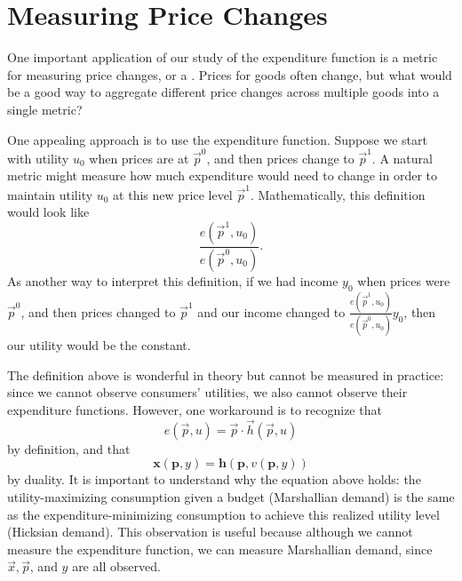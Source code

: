 
\section{Measuring Price Changes}

One important application of our study of the expenditure function is a metric for measuring price changes, or a . Prices for goods often change, but what would be a good way to aggregate different price changes across multiple goods into a single metric?

One appealing approach is to use the expenditure function. Suppose we start with utility $u_0$ when prices are at $\vec{p}^0$, and then prices change to $\vec{p}^1$. A natural metric might measure how much expenditure would need to change in order to maintain utility $u_0$ at this new price level $\vec{p}^1$. Mathematically, this definition would look like
$$\frac{e(\vec{p}^1, u_0)}{e(\vec{p}^0, u_0)}.$$
As another way to interpret this definition, if we had income $y_0$ when prices were $\vec{p}^0$, and then prices changed to $\vec{p}^1$ and our income changed to $\frac{e(\vec{p}^1, u_0)}{e(\vec{p}^0, u_0)}y_0$, then our utility would be the constant.

The definition above is wonderful in theory but cannot be measured in practice: since we cannot observe consumers' utilities, we also cannot observe their expenditure functions. However, one workaround is to recognize that 
$$e(\vec{p}, u) = \vec{p}\cdot \vec{h} (\vec{p}, u)$$
by definition, and that
$$\mathbf{x}(\mathbf{p}, y)=\mathbf{h}(\mathbf{p}, v(\mathbf{p}, y))$$
by duality. It is important to understand why the equation above holds: the utility-maximizing consumption given a budget (Marshallian demand) is the same as the expenditure-minimizing consumption to achieve this realized utility level (Hicksian demand). This observation is useful because although we cannot measure the expenditure function, we can measure Marshallian demand, since $\vec{x}, \vec{p}$, and $y$ are all observed.

